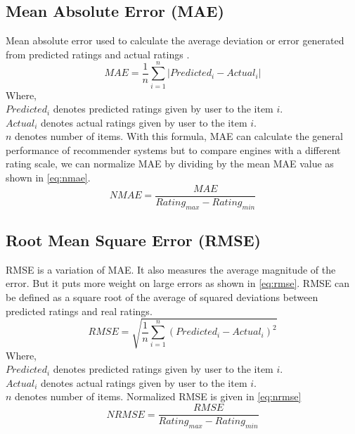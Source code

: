 \subsection{Mean Absolute Error (MAE)}
Mean absolute error used to calculate the average deviation or error generated from predicted ratings and actual ratings \cite{26}.
\begin{equation}
MAE = \frac{1}{n} \sum_{i=1}^{n}{\vert{Predicted_i - Actual_i} \vert}
\label{eq:mae}
\end{equation}
\noindent Where, \\ 
$Predicted_i$ \textsf{ denotes predicted ratings given by user to the item} $i.$ \\
$Actual_i$ \textsf{ denotes actual ratings given by user to the item } $i.$ \\
$n$ \textsf{denotes number of items.}
\noindent With this formula, MAE can calculate the general performance of recommender systems but to compare engines with a different rating scale, we can normalize MAE by dividing by the mean MAE value as shown in \autoref{eq:nmae}. 
\begin{equation}
NMAE = \frac{MAE} {Rating_{max} - Rating_{min}}
\label{eq:nmae}
\end{equation}


\subsection{Root Mean Square Error (RMSE)}
RMSE is a variation of MAE. It also measures the average magnitude of the error. But it puts more weight on large errors as shown in \autoref{eq:rmse}. RMSE can be defined as a square root of the average of squared deviations between predicted ratings and real ratings.
\begin{equation}
RMSE = \sqrt{ \frac{1}{n} \sum_{i=1}^{n}{({Predicted_i - Actual_i} ) ^ {2}}}
\label{eq:rmse}
\end{equation}
\noindent Where, \\
$Predicted_i$ \textsf{ denotes predicted ratings given by user to the item} $i.$ \\
$Actual_i$ \textsf{ denotes actual ratings given by user to the item } $i.$ \\
$n$ \textsf{denotes number of items.}
\noindent Normalized RMSE is given in \autoref{eq:nrmse}
\begin{equation}
NRMSE = \frac{RMSE} {Rating_{max} - Rating_{min}}
\label{eq:nrmse}
\end{equation}



